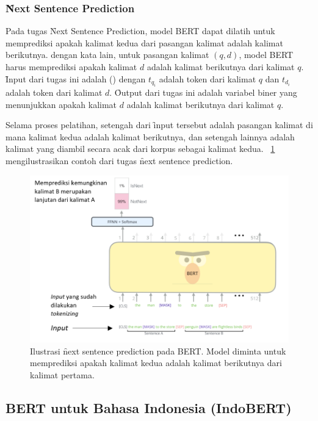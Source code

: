 	\subsubsection{\f{Next Sentence Prediction}}
	\label{sec:next-sentence-prediction}

	Pada tugas \f{Next Sentence Prediction}, model BERT dapat dilatih untuk memprediksi apakah kalimat kedua dari pasangan kalimat adalah kalimat berikutnya. dengan kata lain, untuk pasangan kalimat $(q, d)$, model BERT harus memprediksi apakah kalimat $d$ adalah kalimat berikutnya dari kalimat $q$. \f{Input} dari tugas ini adalah () dengan $t_{q_i}$ adalah token dari kalimat $q$ dan $t_{d_i}$ adalah token dari kalimat $d$. \f{Output} dari tugas ini adalah variabel biner yang menunjukkan apakah kalimat $d$ adalah kalimat berikutnya dari kalimat $q$.
	
	Selama proses pelatihan, setengah dari \f{input} tersebut adalah pasangan kalimat di mana kalimat kedua adalah kalimat berikutnya, dan setengah lainnya adalah kalimat yang diambil secara acak dari korpus sebagai kalimat kedua. \pic~\ref{fig:next-sentence-prediction} mengilustrasikan contoh dari tugas \f{next sentence prediction}.

	\begin{figure}
		\centering
		\includegraphics[width=1\textwidth]{assets/pics/Paste.png}
		\caption{Ilustrasi \f{next sentence prediction} pada BERT. Model diminta untuk memprediksi apakah kalimat kedua adalah kalimat berikutnya dari kalimat pertama.}
		\label{fig:next-sentence-prediction}
	\end{figure}

	
	\subsection{BERT untuk Bahasa Indonesia (IndoBERT)}

